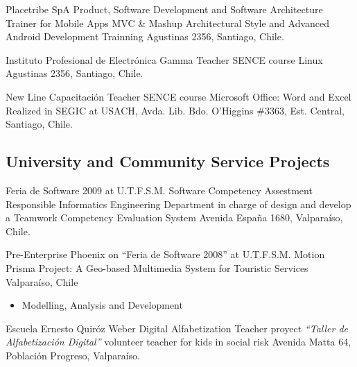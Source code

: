 \documentclass[11pt,letterpaper,roman]{moderncv}
\begin{document}
	{Placetribe SpA} %
	{Product, Software Development and  Software Architecture Trainer for Mobile Apps} %
	{} %
	{MVC \& Mashup Architectural Style and Advanced Android Development Trainning}
    	{Agustinas 2356, Santiago, Chile.}

	{Instituto Profesional de Electrónica Gamma} %
	{Teacher} %
	{SENCE course} %
	{Linux}
    	{Agustinas 2356, Santiago, Chile.}
	
	{New Line Capacitación} %
	{Teacher} %
	{SENCE course} %
	{Microsoft Office: Word and Excel}
	{Realized in SEGIC at USACH, Avda. Lib. Bdo. O'Higgins \#3363, Est.
    Central, Santiago, Chile.}
	

	

	
	
\subsection{University and Community Service Projects}

	{Feria de Software 2009 at U.T.F.S.M.}
	{Software Competency Assestment Responsible}
	{Informatics Engineering Department}
	{in charge of design and develop a Teamwork Competency Evaluation
System}
	{Avenida Espa\~na 1680,  Valpara\'iso, Chile.}

	{Pre-Enterprise Phoenix on ``Feria de Software 2008'' at U.T.F.S.M.}
	{Motion Prisma Project: A Geo-based Multimedia System for Touristic
Services}
	{Valparaíso, Chile}{}
	{\begin{itemize}
		\item Modelling, Analysis and Development 
	\end{itemize}}
	
%

	{Escuela Ernesto Quir\'oz Weber}
	{Digital Alfabetization Teacher}
	{proyect \textit{``Taller de Alfabetizaci\'on Digital''}}
	{volunteer teacher for kids in social risk}
	{Avenida Matta 64, Poblaci\'on Progreso, Valpara\'iso.}
 
\end{document}
